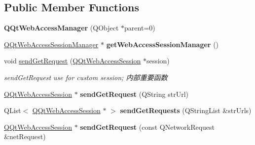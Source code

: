 \subsection*{Public Member Functions}
\begin{DoxyCompactItemize}
\item 
\mbox{\label{class_q_qt_web_access_manager_a8a20a238854350eadec2b516d02700bc}} 
{\bfseries Q\+Qt\+Web\+Access\+Manager} (Q\+Object $\ast$parent=0)
\item 
\mbox{\label{class_q_qt_web_access_manager_a9d55201e99232b2f670003d1be25b39b}} 
\mbox{\hyperlink{class_q_qt_web_access_session_manager}{Q\+Qt\+Web\+Access\+Session\+Manager}} $\ast$ {\bfseries get\+Web\+Access\+Session\+Manager} ()
\item 
void \mbox{\hyperlink{class_q_qt_web_access_manager_a8f547f06beac2617150ee9efddd9b477}{send\+Get\+Request}} (\mbox{\hyperlink{class_q_qt_web_access_session}{Q\+Qt\+Web\+Access\+Session}} $\ast$session)
\begin{DoxyCompactList}\small\item\em send\+Get\+Request use for custom session; 内部重要函数 \end{DoxyCompactList}\item 
\mbox{\label{class_q_qt_web_access_manager_a42136056f1eb8fe0381001f6a59bcfa2}} 
\mbox{\hyperlink{class_q_qt_web_access_session}{Q\+Qt\+Web\+Access\+Session}} $\ast$ {\bfseries send\+Get\+Request} (Q\+String str\+Url)
\item 
\mbox{\label{class_q_qt_web_access_manager_a4c8022f41ea942a1aef94797ac06421c}} 
Q\+List$<$ \mbox{\hyperlink{class_q_qt_web_access_session}{Q\+Qt\+Web\+Access\+Session}} $\ast$ $>$ {\bfseries send\+Get\+Requests} (Q\+String\+List \&str\+Urls)
\item 
\mbox{\label{class_q_qt_web_access_manager_a7a5aeec4b18bf19a662f36f372191d2b}} 
\mbox{\hyperlink{class_q_qt_web_access_session}{Q\+Qt\+Web\+Access\+Session}} $\ast$ {\bfseries send\+Get\+Request} (const Q\+Network\+Request \&net\+Request)
\item 
\mbox{\label{class_q_qt_web_access_manager_ae7550546047f6e5a97906ec35e6e7b51}} 

\end{DoxyCompactItemize}
